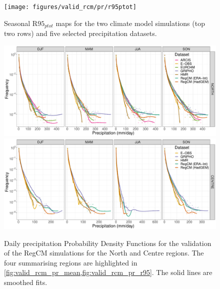\begin{figure}
    \centering
    \texttt{[image: figures/valid\_rcm/pr/r95ptot]}
    \decoRule
    \caption[Validation of extreme events ($\textrm{R95}_{ptot}$)]{
        Seasonal $\textrm{R95}_{ptot}$ maps for the two climate model simulations (top two rows) and five selected precipitation datasets.
    } \label{fig:valid_rcm_pr_r95}
\end{figure}
\afterpage{\clearpage}
\begin{figure}
    \centering
        \includegraphics[width=0.8\textheight]{figures/valid_rcm/pr/pdf_NORTH_lines}
        \includegraphics[width=0.8\textheight]{figures/valid_rcm/pr/pdf_CENTRE_lines}
    \caption[Validation of RegCM precipitation PDFs (1)]{
        Daily precipitation Probability Density Functions for the validation of the RegCM simulations for the North and Centre regions. The four summarising regions are highlighted in \cref{fig:valid_rcm_pr_mean,fig:valid_rcm_pr_r95}. The solid lines are smoothed fits.
    }\label{fig:valid_rcm_pr_pdf1}
\end{figure}
